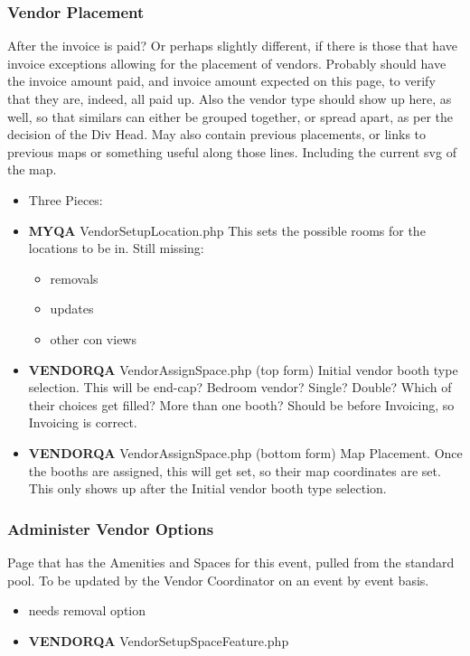 \documentclass[captions=tablesignature]{scrartcl}
\begin{document}
\subsubsection{Vendor Placement}
\label{sec-3-1-12}
After the invoice is paid? Or perhaps slightly different, if there
is those that have invoice exceptions allowing for the placement
of vendors.  Probably should have the invoice amount paid, and
invoice amount expected on this page, to verify that they are,
indeed, all paid up.  Also the vendor type should show up here, as
well, so that similars can either be grouped together, or spread
apart, as per the decision of the Div Head. May also contain
previous placements, or links to previous maps or something useful
along those lines.  Including the current svg of the map.
\begin{itemize}
\item Three Pieces:
\end{itemize}
\begin{itemize}
\item {\bfseries\sffamily MYQA} VendorSetupLocation.php
\label{sec-3-1-12-1}
This sets the possible rooms for the locations to be in.
Still missing:
\begin{itemize}
\item removals
\item updates
\item other con views
\end{itemize}

\item {\bfseries\sffamily VENDORQA} VendorAssignSpace.php (top form)
\label{sec-3-1-12-2}
Initial vendor booth type selection.
This will be end-cap?  Bedroom vendor?  Single?  Double? Which of
their choices get filled? More than one booth? Should be before
Invoicing, so Invoicing is correct.

\item {\bfseries\sffamily VENDORQA} VendorAssignSpace.php (bottom form)
\label{sec-3-1-12-3}
Map Placement.
Once the booths are assigned, this will get set, so their map
coordinates are set.  This only shows up after the Initial vendor
booth type selection.
\end{itemize}

\subsubsection{Administer Vendor Options}
\label{sec-3-1-13}
Page that has the Amenities and Spaces for this event, pulled from
the standard pool.  To be updated by the Vendor Coordinator on an
event by event basis.
\begin{itemize}
\item needs removal option
\end{itemize}
\begin{itemize}
\item {\bfseries\sffamily VENDORQA} VendorSetupSpaceFeature.php
\label{sec-3-1-13-1}
\end{itemize}
\end{document}
